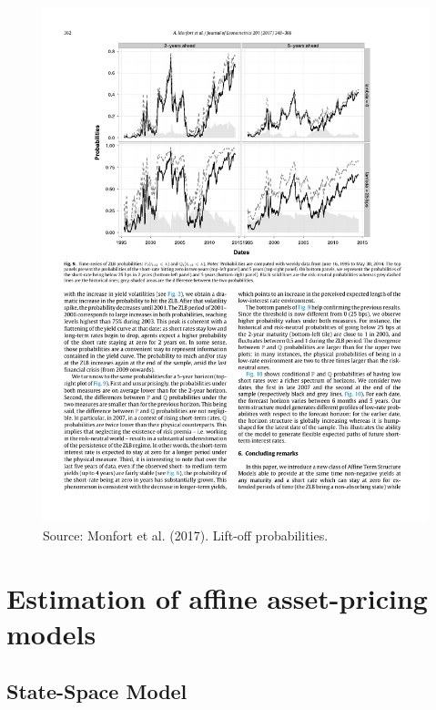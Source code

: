 \documentclass[
  12pt,
]{book}
\theoremstyle{definition}
\theoremstyle{definition}
\theoremstyle{definition}
\theoremstyle{definition}
\theoremstyle{remark}
\begin{document}
\begin{figure}

{\centering \includegraphics[width=0.95\linewidth]{figures/Figure_LiftOff} 

}

\caption{Source: Monfort et al. (2017). Lift-off probabilities.}\label{fig:liftOff}
\end{figure}

\hypertarget{estimation-of-affine-asset-pricing-models}{%
\chapter{Estimation of affine asset-pricing models}\label{estimation-of-affine-asset-pricing-models}}

\hypertarget{EstimationSSModel}{%
\section{State-Space Model}\label{EstimationSSModel}}
\end{document}
